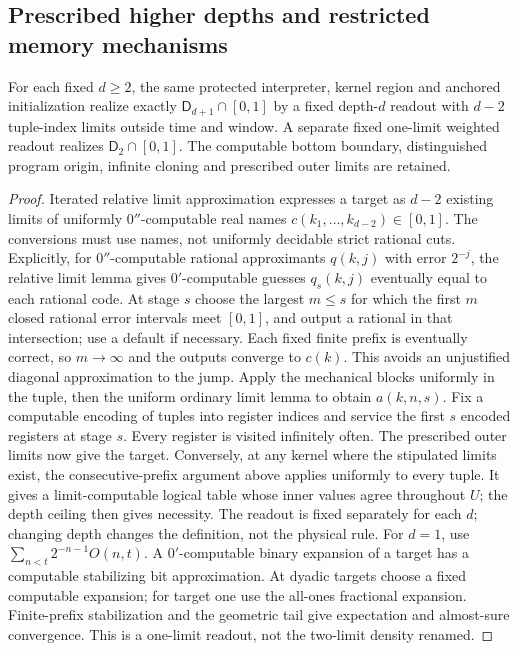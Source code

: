 \subsection{Prescribed higher depths and restricted memory mechanisms}
\begin{corollary}\label{cor:robust-depth}
For each fixed $d\geq2$, the same protected interpreter, kernel
region and anchored initialization realize exactly
$\mathsf D_{d+1}\cap[0,1]$ by a fixed depth-$d$ readout with
$d-2$ tuple-index limits outside time and window. A separate fixed
one-limit weighted readout realizes $\mathsf D_2\cap[0,1]$.
The computable bottom boundary, distinguished program origin,
infinite cloning and prescribed outer limits are retained.
\end{corollary}
\begin{proof}
Iterated relative limit approximation expresses a target as
$d-2$ existing limits of uniformly $0''$-computable real names
$c(k_1,\ldots,k_{d-2})\in[0,1]$. The conversions must use names,
not uniformly decidable strict rational cuts. Explicitly, for
$0''$-computable rational approximants $q(k,j)$ with error $2^{-j}$,
the relative limit lemma gives $0'$-computable guesses
$q_s(k,j)$ eventually equal to each rational code. At stage $s$
choose the largest $m\leq s$ for which the first $m$ closed rational
error intervals meet $[0,1]$, and output a rational in that intersection;
use a default if necessary. Each fixed finite prefix is eventually
correct, so $m\to\infty$ and the outputs converge to $c(k)$.
This avoids an unjustified diagonal approximation to the jump.
Apply the mechanical blocks uniformly in the tuple, then the
uniform ordinary limit lemma to obtain $a(k,n,s)$. Fix a computable
encoding of tuples into register indices and service the first $s$
encoded registers at stage $s$. Every register is visited infinitely
often. The prescribed outer limits now give the target. Conversely,
at any kernel where the stipulated limits exist, the consecutive-prefix
argument above applies uniformly to every tuple. It gives a
limit-computable logical table whose inner values agree throughout
$U$; the depth ceiling then gives necessity. The readout is fixed separately for
each $d$; changing depth changes the definition, not the physical rule.
For $d=1$, use $\sum_{n<t}2^{-n-1}O(n,t)$. A $0'$-computable
binary expansion of a target has a computable stabilizing bit
approximation. At dyadic targets choose a fixed computable expansion;
for target one use the all-ones fractional expansion.
Finite-prefix stabilization and the geometric tail
give expectation and almost-sure convergence. This is a one-limit
readout, not the two-limit density renamed.
\end{proof}

